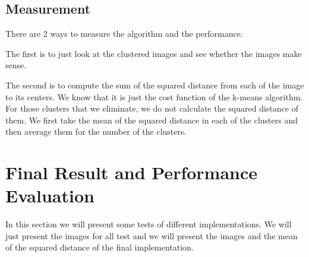 \documentclass{article}
\begin{document}
\subsection{Measurement}
There are 2 ways to measure the algorithm and the performance.\par The first is to just look at the clustered images and see whether the images make sense.\par
The second is to compute the sum of the squared distance from each of the image to its centers. We know that it is just the cost function of the k-means algorithm. For those clusters that we eliminate, we do not calculate the squared distance of them. We first take the mean of the squared distance in each of the clusters and then average them for the number of the clusters.


\section{Final Result and Performance Evaluation}
In this section we will present some tests of different implementations. We will just present the images for all test and we will present the images and the mean of the squared distance of the final implementation.\par
\end{document}
